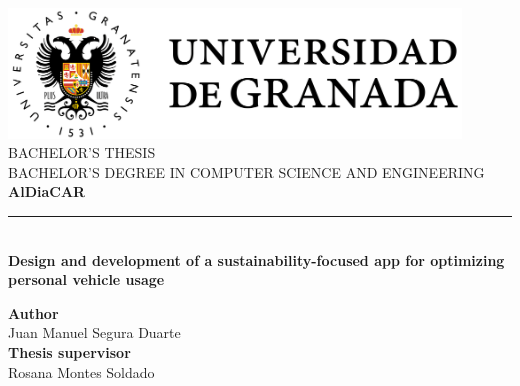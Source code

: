 \begin{titlepage}

  \newlength{\centeroffset}
  \setlength{\centeroffset}{-0.5\oddsidemargin}
  \addtolength{\centeroffset}{0.5\evensidemargin}
  \thispagestyle{empty}

  \noindent\hspace*{\centeroffset}
  \begin{minipage}{\textwidth}
    \centering

    \includegraphics[width=0.9\textwidth]{images/ugr-full.png} \\[1em]

    \textsc{\Large BACHELOR'S THESIS} \\[0.2cm]
    \textsc{BACHELOR'S DEGREE IN COMPUTER SCIENCE AND ENGINEERING} \\[1cm]

    {\Huge\bfseries AlDiaCAR} \\

    \noindent\rule[-1ex]{\textwidth}{2pt} \\[3.5ex]

    {\large\bfseries Design and development of a sustainability-focused app for optimizing personal vehicle usage}
  \end{minipage}

  \vspace{2.5cm}
  \noindent\hspace*{\centeroffset}

  \begin{minipage}{\textwidth}
    \centering

    \textbf{Author} \\[0.1em]
    \textnormal{Juan Manuel Segura Duarte} \\[2.5ex]

    \textbf{Thesis supervisor} \\[0.1em]
    \textnormal{Rosana Montes Soldado} \\[2cm]


\end{minipage}
\end{titlepage}
